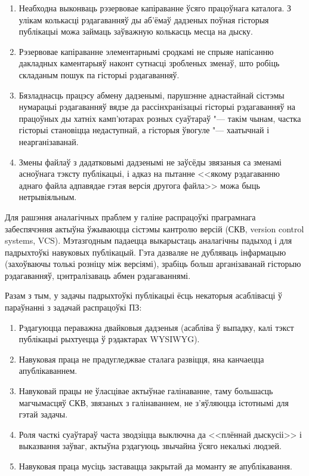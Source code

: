 \documentclass[10pt, a5paper]{article}
\begin{document}
\begin{enumerate}
  \item Неабходна выконваць рэзервовае капіраванне ўсяго працоўнага каталога. З улікам колькасці рэдагаванняў ды аб'ёмаў дадзеных поўная гісторыя публікацыі можа займаць заўважную колькасць месца на дыску.
  \item Рэзервовае капіраванне элементарнымі сродкамі не спрыяе напісанню дакладных каментарыяў наконт сутнасці зробленых зменаў, што робіць складаным пошук па гісторыі рэдагаванняў.
  \item Бязладнасць працэсу абмену дадзенымі, парушэнне аднастайнай сістэмы нумарацыі рэдагаванняў вядзе да рассінхранізацыі гісторыі рэдагаванняў на працоўных ды хатніх \linebreak камп'ютарах розных суаўтараў "--- такім чынам, частка гісторыі становіцца недаступнай, а гісторыя ўвогуле "--- хаатычнай і неарганізаванай.
  \item Змены файлаў з дадатковымі дадзенымі не заўсёды звязаныя са зменамі асноўнага тэксту публікацыі, і адказ на пытанне <<якому рэдагаванню аднаго файла адпавядае гэтая версія другога файла>> можа быць нетрывіяльным.
\end{enumerate}

Для рашэння аналагічных праблем у галіне распрацоўкі праграмнага забеспячэння актыўна ўжываюцца сістэмы кантролю версій (СКВ, version control systems, VCS). Мэтазгодным падаецца выкарыстаць аналагічны падыход і для падрыхтоўкі навуковых публікацый. Гэта дазваляе не дубляваць інфармацыю (захоўваючы толькі розніцу між версіямі), зрабіць больш арганізаванай гісторыю рэдагаванняў, цэнтралізаваць абмен рэдагаваннямі.

Разам з тым, у задачы падрыхтоўкі публікацыі ёсць некаторыя асаблівасці ў параўнанні з задачай распрацоўкі ПЗ:

\begin{enumerate}
  \item Рэдагуюцца пераважна двайковыя дадзеныя (асабліва ў выпадку, калі тэкст публікацыі рыхтуецца ў рэдактарах \linebreak WYSIWYG).
  \item Навуковая праца не прадугледжвае сталага развіцця, яна канчаецца апублікаваннем.
  \item Навуковай працы не ўласцівае актыўнае галінаванне, таму большасць магчымасцяў СКВ, звязаных з галінаваннем, не з'яўляюцца істотнымі для гэтай задачы.
  \item Роля часткі суаўтараў часта зводзіцца выключна да <<плённай дыскусіі>> і выказвання заўваг, актыўна рэдагуюць звычайна ўсяго некалькі людзей.
  \item Навуковая праца мусіць заставацца закрытай да моманту яе апублікавання.
\end{enumerate}
\end{document}
